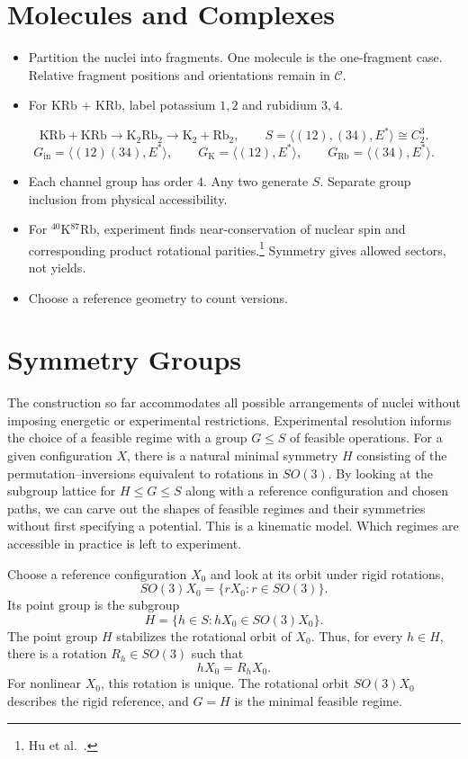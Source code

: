 \documentclass[12pt]{article}
\newcommand{\conf}{\mathcal{C}}
\begin{document}
\section{Molecules and Complexes}
\begin{itemize}
\item Partition the nuclei into fragments. One molecule is the
one-fragment case. Relative fragment positions and orientations remain in $\conf$.
\item For KRb + KRb, label potassium $1,2$ and rubidium $3,4$.
\end{itemize}
\[
\mathrm{KRb}+\mathrm{KRb}
\longrightarrow\mathrm K_2\mathrm{Rb}_2
\longrightarrow\mathrm K_2+\mathrm{Rb}_2,
\qquad S=\langle(12),(34),E^*\rangle\cong C_2^3.
\]
\[
G_{\mathrm{in}}=\langle(12)(34),E^*\rangle,
\qquad G_{\mathrm K}=\langle(12),E^*\rangle,
\qquad G_{\mathrm{Rb}}=\langle(34),E^*\rangle.
\]
\begin{itemize}
\item Each channel group has order $4$. Any two generate $S$.
Separate group inclusion from physical accessibility.
\item For $^{40}\mathrm K{}^{87}\mathrm{Rb}$, experiment finds
near-conservation of nuclear spin and corresponding product rotational
parities.\footnote{Hu et al.\ \cite{HuEtAl2021}.}
Symmetry gives allowed sectors, not yields.
\item Choose a reference geometry to count versions.
\end{itemize}


\section{Symmetry Groups}
\label{sec:feasible-regimes}

The construction so far accommodates all possible
arrangements of nuclei without imposing energetic or
experimental restrictions. Experimental resolution informs the choice of a feasible
regime with a group $G\leq S$ of feasible operations. For a given configuration $X$,
there is a natural minimal symmetry $H$ consisting of the
permutation--inversions equivalent to rotations in $SO(3)$. By looking at the subgroup lattice for $H\leq G\leq S$
along with a reference configuration and chosen paths,
we can carve out the shapes of feasible regimes and
their symmetries without first specifying a potential.
This is a kinematic model. Which
regimes are accessible in practice is left to experiment.

Choose a reference configuration $X_0$ and look at its orbit
under rigid rotations,
\[
SO(3)X_0=\{rX_0:r\in SO(3)\}.
\]
Its point group is the subgroup
\[
H
=
\{h\in S:hX_0\in SO(3)X_0\}.
\]
The point group $H$ stabilizes the rotational orbit of $X_0$.
Thus, for every $h\in H$, there is a rotation $R_h\in SO(3)$
such that
\[
hX_0=R_hX_0.
\]
For nonlinear $X_0$, this rotation is unique. The rotational
orbit $SO(3)X_0$ describes the rigid reference, and $G=H$ is
the minimal feasible regime.
\end{document}
